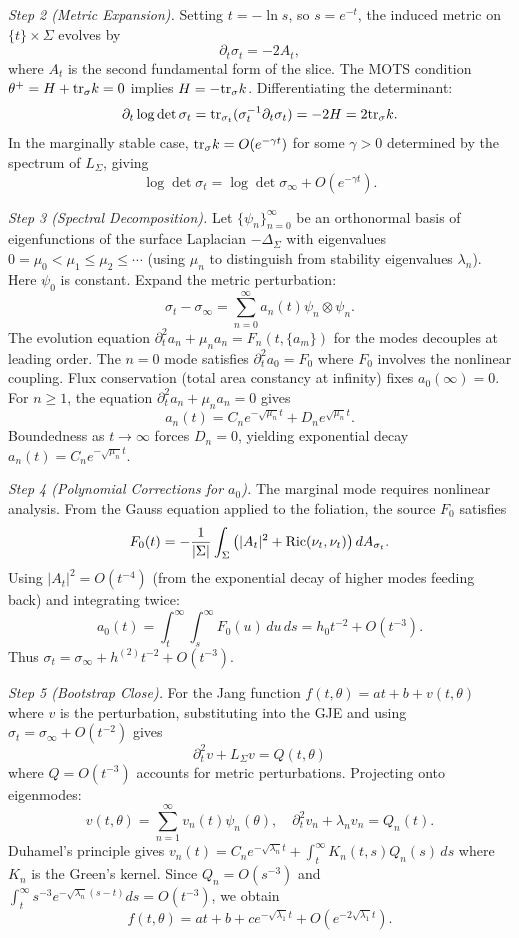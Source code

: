 \begin{lemma}
\textit{Step 2 (Metric Expansion).} Setting $t = -\ln s$, so $s = e^{-t}$, the induced metric on $\{t\} \times \Sigma$ evolves by
\[
    \partial_t \sigma_t = -2 A_t,
\]
where $A_t$ is the second fundamental form of the slice. The MOTS condition $\theta^+ = H + \mathrm{tr}_\sigma k = 0$ implies $H = -\mathrm{tr}_\sigma k$. Differentiating the determinant:
\[
    \partial_t \log \det \sigma_t = \mathrm{tr}_{\sigma_t}(\sigma_t^{-1} \partial_t \sigma_t) = -2H = 2\mathrm{tr}_\sigma k.
\]
In the marginally stable case, $\mathrm{tr}_\sigma k = O(e^{-\gamma t})$ for some $\gamma > 0$ determined by the spectrum of $L_\Sigma$, giving
\[
    \log \det \sigma_t = \log \det \sigma_\infty + O(e^{-\gamma t}).
\]

\textit{Step 3 (Spectral Decomposition).} Let $\{\psi_n\}_{n=0}^\infty$ be an orthonormal basis of eigenfunctions of the surface Laplacian $-\Delta_\Sigma$ with eigenvalues $0 = \mu_0 < \mu_1 \le \mu_2 \le \cdots$ (using $\mu_n$ to distinguish from stability eigenvalues $\lambda_n$). Here $\psi_0$ is constant. Expand the metric perturbation:
\[
    \sigma_t - \sigma_\infty = \sum_{n=0}^\infty a_n(t) \psi_n \otimes \psi_n.
\]
The evolution equation $\partial_t^2 a_n + \mu_n a_n = F_n(t, \{a_m\})$ for the modes decouples at leading order. The $n=0$ mode satisfies $\partial_t^2 a_0 = F_0$ where $F_0$ involves the nonlinear coupling. Flux conservation (total area constancy at infinity) fixes $a_0(\infty) = 0$. For $n \ge 1$, the equation $\partial_t^2 a_n + \mu_n a_n = 0$ gives
\[
    a_n(t) = C_n e^{-\sqrt{\mu_n} t} + D_n e^{\sqrt{\mu_n} t}.
\]
Boundedness as $t \to \infty$ forces $D_n = 0$, yielding exponential decay $a_n(t) = C_n e^{-\sqrt{\mu_n} t}$.

\textit{Step 4 (Polynomial Corrections for $a_0$).} The marginal mode requires nonlinear analysis. From the Gauss equation applied to the foliation, the source $F_0$ satisfies
\[
    F_0(t) = -\frac{1}{|\Sigma|} \int_\Sigma \left( |A_t|^2 + \mathrm{Ric}(\nu_t,\nu_t) \right) dA_{\sigma_t}.
\]
Using $|A_t|^2 = O(t^{-4})$ (from the exponential decay of higher modes feeding back) and integrating twice:
\[
    a_0(t) = \int_t^\infty \int_s^\infty F_0(u) \, du \, ds = h_0 t^{-2} + O(t^{-3}).
\]
Thus $\sigma_t = \sigma_\infty + h^{(2)} t^{-2} + O(t^{-3})$.

\textit{Step 5 (Bootstrap Close).} For the Jang function $f(t,\theta) = at + b + v(t,\theta)$ where $v$ is the perturbation, substituting into the GJE and using $\sigma_t = \sigma_\infty + O(t^{-2})$ gives
\[
    \partial_t^2 v + L_\Sigma v = Q(t,\theta)
\]
where $Q = O(t^{-3})$ accounts for metric perturbations. Projecting onto eigenmodes:
\[
    v(t,\theta) = \sum_{n=1}^\infty v_n(t) \psi_n(\theta), \quad \partial_t^2 v_n + \lambda_n v_n = Q_n(t).
\]
Duhamel's principle gives $v_n(t) = C_n e^{-\sqrt{\lambda_n} t} + \int_t^\infty K_n(t,s) Q_n(s) \, ds$ where $K_n$ is the Green's kernel. Since $Q_n = O(s^{-3})$ and $\int_t^\infty s^{-3} e^{-\sqrt{\lambda_n}(s-t)} ds = O(t^{-3})$, we obtain
\[
    f(t,\theta) = at + b + c e^{-\sqrt{\lambda_1} t} + O(e^{-2\sqrt{\lambda_1} t}).
\]


\end{lemma}
